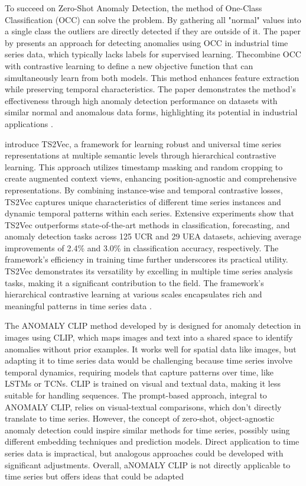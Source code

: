 %
To succeed on Zero-Shot Anomaly Detection, the method of One-Class Classification (OCC) can solve the problem. %
By gathering all "normal" values into a single class the outliers are directly detected if they are outside of it. The paper by  presents an approach for detecting anomalies using OCC in industrial time series data, which typically lacks labels for supervised learning. Thecombine OCC with contrastive learning to define a new objective function that can simultaneously learn from both models. This method enhances feature extraction while preserving temporal characteristics. The paper demonstrates the method's effectiveness through high anomaly detection performance on datasets with similar normal and anomalous data forms, highlighting its potential in industrial applications \cite{lee_time_2023}.

 introduce TS2Vec, a framework for learning robust and universal time series representations at multiple semantic levels through hierarchical contrastive learning. This approach utilizes timestamp masking and random cropping to create augmented context views, enhancing position-agnostic and comprehensive representations. By combining instance-wise and temporal contrastive losses, TS2Vec captures unique characteristics of different time series instances and dynamic temporal patterns within each series. Extensive experiments show that TS2Vec outperforms state-of-the-art methods in classification, forecasting, and anomaly detection tasks across 125 UCR and 29 UEA datasets, achieving average improvements of 2.4\% and 3.0\% in classification accuracy, respectively. The framework's efficiency in training time further underscores its practical utility. TS2Vec demonstrates its versatility by excelling in multiple time series analysis tasks, making it a significant contribution to the field. The framework's hierarchical contrastive learning at various scales encapsulates rich and meaningful patterns in time series data \cite{yue_ts2vec_2022}.

The ANOMALY CLIP method developed by  is designed for anomaly detection in images using CLIP, which maps images and text into a shared space to identify anomalies without prior examples. It works well for spatial data like images, but adapting it to time series data would be challenging because time series involve temporal dynamics, requiring models that capture patterns over time, like LSTMs or TCNs. CLIP is trained on visual and textual data, making it less suitable for handling sequences. The prompt-based approach, integral to ANOMALY CLIP, relies on visual-textual comparisons, which don't directly translate to time series. However, the concept of zero-shot, object-agnostic anomaly detection could inspire similar methods for time series, possibly using different embedding techniques and prediction models. Direct application to time series data is impractical, but analogous approaches could be developed with significant adjustments. Overall, aNOMALY CLIP is not directly applicable to time series but offers ideas that could be adapted \cite{zhou_anomalyclip_2024}

